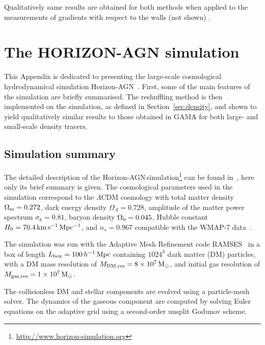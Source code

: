 \documentclass[useAMS,usenatbib]{mnras}
\newcommand{\hagn}{\mbox{{\sc \small Horizon-AGN}}}
\begin{document}
Qualitatively same results are obtained for both methods when applied to the measurements of gradients with respect to the walls (not shown) .



\section{The HORIZON-AGN simulation}
\label{sec:appendix_hagn}
 
This Appendix is dedicated to presenting the large-scale cosmological hydrodynamical simulation \hagn~\citep{Dubois2014}.  
First, some of the main features of the simulation are briefly summarised. The reshuffling method is then implemented on the simulation, as defined in Section~\ref{sec:density}, and shown to yield qualitatively similar results  to those obtained in GAMA for both large- and small-scale density tracers.  
 
\subsection{Simulation summary} 
 \label{subsec:appendix_hagn_summary}
 
The detailed description of the \hagn\,simulation\footnote{ \href{http://www.horizon-simulation.org}{http://www.horizon-simulation.org}} can be found in~\cite{Dubois2014}, here only its brief summary is given. 
The cosmological parameters used in the simulation correspond to the $\Lambda$CDM cosmology with total matter density $\Omega_{\rm  m}=0.272$, dark energy density $\Omega_\Lambda=0.728$, amplitude of the matter power spectrum $\sigma_8=0.81$, baryon density $\Omega_{\rm  b}=0.045$, Hubble constant $H_0=70.4 \, \rm km\,s^{-1}\,Mpc^{-1}$, and $n_s=0.967$ compatible with the WMAP-7 data~\citep{Komatsu2011}. 

The simulation was run with the Adaptive Mesh Refinement code RAMSES~\citep{Teyssier2002} in a box of length $L_{\rm box} = 100\, h^{-1}\, \rm Mpc$ containing $1024^3$ dark matter (DM) particles, with a DM mass resolution of $M_{\rm  DM, res}=8\times10^7 \, \rm M_\odot$, and initial gas resolution of $M_{\rm gas,res}=1\times 10^7 \, \rm M_\odot$. 
 
The collisionless DM and stellar components are evolved using a particle-mesh solver. The dynamics of the gaseous component are computed by solving Euler equations on the
adaptive grid using a second-order unsplit Godunov scheme.
\end{document}
